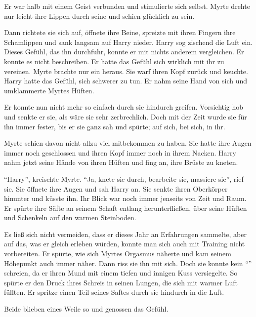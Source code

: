 \begin{abAchtzehn}
Er war halb mit einem Geist verbunden und stimulierte sich selbst. Myrte drehte nur leicht ihre Lippen durch seine und schien glücklich zu sein.

Dann richtete sie sich auf, öffnete ihre Beine, spreizte mit ihren Fingern ihre Schamlippen und sank langsam auf Harry nieder. Harry sog zischend die Luft ein. Dieses Gefühl, das ihn durchfuhr, konnte er mit nichts anderem vergleichen. Er konnte es nicht beschreiben. Er hatte das Gefühl sich wirklich mit ihr zu vereinen. Myrte brachte nur ein  heraus. Sie warf ihren Kopf zurück und keuchte. Harry hatte das Gefühl, sich schwerer zu tun. Er nahm seine Hand von sich und umklammerte Myrtes Hüften.

Er konnte nun nicht mehr so einfach durch sie hindurch greifen. Vorsichtig hob und senkte er sie, als wäre sie sehr zerbrechlich. Doch mit der Zeit wurde sie für ihn immer fester, bis er sie ganz sah und spürte; auf sich, bei sich, in ihr.

Myrte schien davon nicht allzu viel mitbekommen zu haben. Sie hatte ihre Augen immer noch geschlossen und ihren Kopf immer noch in ihrem Nacken. Harry nahm jetzt seine Hände von ihren Hüften und fing an, ihre Brüste zu kneten.

\enquote{Harry}, kreischte Myrte. \enquote{Ja, knete sie durch, bearbeite sie, massiere sie}, rief sie. Sie öffnete ihre Augen und sah Harry an. Sie senkte ihren Oberkörper hinunter und küsste ihn. Ihr Blick war noch immer jenseits von Zeit und Raum. Er spürte ihre Säfte an seinem Schaft entlang herunterfließen, über seine Hüften und Schenkeln auf den warmen Steinboden.

Es ließ sich nicht vermeiden, dass er dieses Jahr an Erfahrungen sammelte, aber auf das, was er gleich erleben würden, konnte man sich auch mit Training nicht vorbereiten. Er spürte, wie sich Myrtes Orgasmus näherte und kam seinem Höhepunkt auch immer näher. Dann riss sie ihn mit sich. Doch sie konnte kein \enquote{} schreien, da er ihren Mund mit einem tiefen und innigen Kuss versiegelte. So spürte er den Druck ihres Schreis in seinen Lungen, die sich mit warmer Luft füllten. Er spritze einen Teil seines Saftes durch sie hindurch in die Luft.
\end{abAchtzehn}

\begin{safedivide}
Beide blieben eines Weile so und genossen das Gefühl.
\end{safedivide}

